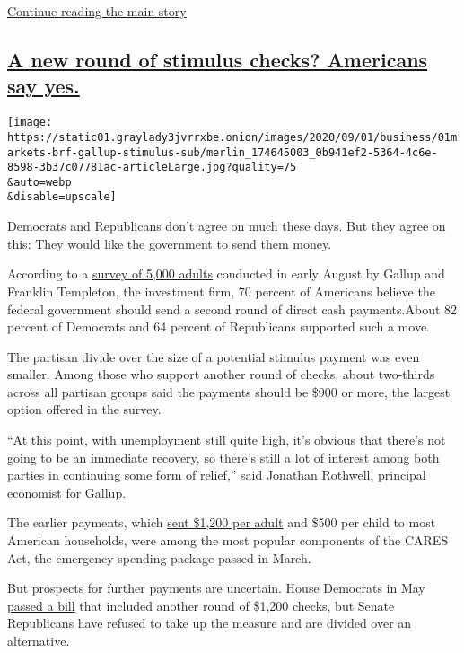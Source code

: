 \protect\hyperlink{after-dfp-ad-mid3}{Continue reading the main story}

\hypertarget{a-new-round-of-stimulus-checks-americans-say-yes}{%
\subsection{\texorpdfstring{\protect\hyperlink{a-new-round-of-stimulus-checks-americans-say-yes}{A
new round of stimulus checks? Americans say
yes.}}{A new round of stimulus checks? Americans say yes.}}\label{a-new-round-of-stimulus-checks-americans-say-yes}}

\texttt{[image: https://static01.graylady3jvrrxbe.onion/images/2020/09/01/business/01markets-brf-gallup-stimulus-sub/merlin\_174645003\_0b941ef2-5364-4c6e-8598-3b37c07781ac-articleLarge.jpg?quality=75\\\&auto=webp\\\&disable=upscale]}

Democrats and Republicans don't agree on much these days. But they agree
on this: They would like the government to send them money.

According to a
\href{https://news.gallup.com/poll/318452/broad-bipartisan-support-additional-stimulus.aspx}{survey
of 5,000 adults} conducted in early August by Gallup and Franklin
Templeton, the investment firm, 70 percent of Americans believe the
federal government should send a second round of direct cash
payments.About 82 percent of Democrats and 64 percent of Republicans
supported such a move.

The partisan divide over the size of a potential stimulus payment was
even smaller. Among those who support another round of checks, about
two-thirds across all partisan groups said the payments should be \$900
or more, the largest option offered in the survey.

``At this point, with unemployment still quite high, it's obvious that
there's not going to be an immediate recovery, so there's still a lot of
interest among both parties in continuing some form of relief,'' said
Jonathan Rothwell, principal economist for Gallup.

The earlier payments, which
\href{https://www.nytimes3xbfgragh.onion/article/where-is-my-stimulus-payment.html}{sent
\$1,200 per adult} and \$500 per child to most American households, were
among the most popular components of the CARES Act, the emergency
spending package passed in March.

But prospects for further payments are uncertain. House Democrats in May
\href{https://www.nytimes3xbfgragh.onion/2020/05/15/us/politics/house-simulus-vote.html}{passed
a bill} that included another round of \$1,200 checks, but Senate
Republicans have refused to take up the measure and are divided over an
alternative.

